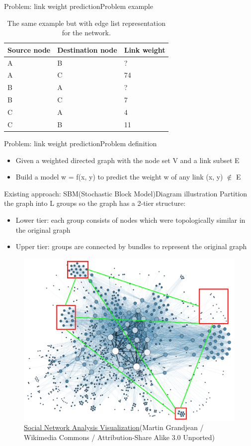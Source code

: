 \documentclass{beamer}
\begin{document}
\begin{frame}{Problem: link weight prediction}{Problem example}
	\begin{table}[H]\centering
		\caption{
			The same example but with edge list representation for the network.
		}
		\begin{tabularx}{\textwidth}{|X|X|X|}  \hline
			Source node & Destination node & Link weight \\ \hline
			A & B & ? \\ \hline
			A & C & 74 \\ \hline
			B & A & ? \\ \hline
			B & C & 7 \\ \hline
			C & A & 4 \\ \hline
			C & B & 11 \\ \hline
		\end{tabularx}
		\label{tab:example}
	\end{table}
\end{frame}

\begin{frame}{Problem: link weight prediction}{Problem definition}
	\begin{itemize}
		\item Given a weighted directed graph with the node set V and a link subset E
		\item Build a model w = f(x, y) to predict the weight w of any link (x, y) $ \notin $ E
	\end{itemize}
\end{frame}

\begin{frame}{Existing approach: SBM(Stochastic Block Model)}{Diagram illustration}
	Partition the graph into L groups so the graph has a 2-tier structure:
	\begin{itemize}
		\item Lower tier: each group consists of nodes which were topologically similar in the original graph
		\item Upper tier: groups are connected by bundles to represent the original graph
	\end{itemize}
	\begin{figure}[H]
		\centering
		\includegraphics[width=0.4\linewidth]{SBM}
		\caption{ \href{https://commons.wikimedia.org/wiki/File:Social_Network_Analysis_Visualization.png}{Social Network Analysis Visualization}(Martin Grandjean / Wikimedia Commons / Attribution-Share Alike 3.0 Unported)}
		\label{fig:SBM}
	\end{figure}
\end{frame}
\end{document}
